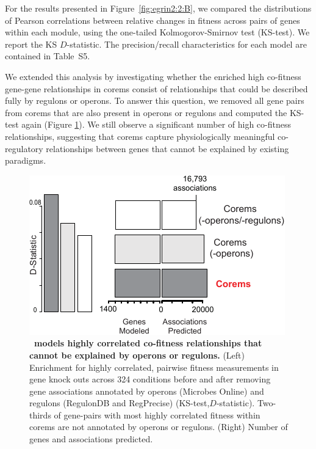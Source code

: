 For the results presented in Figure~\ref{fig:egrin2:2:B}, we compared the distributions of Pearson correlations between relative changes in fitness across pairs of genes within each module, using the one-tailed Kolmogorov-Smirnov test (KS-test). We report the KS $D$-statistic. The precision/recall characteristics for each model are contained in Table~S5.

We extended this analysis by investigating whether the enriched high co-fitness gene-gene relationships in corems consist of relationships that could be described fully by regulons or operons. To answer this question, we removed all gene pairs from corems that are also present in operons or regulons and computed the KS-test again (Figure \ref{fig:fitness_wo_operons}). We still observe a significant number of high co-fitness relationships, suggesting that corems capture physiologically meaningful co-regulatory relationships between genes that cannot be explained by existing paradigms.

\begin{figure}[hp]
\centering
\includegraphics[width=0.6\linewidth]{figures/fitness_wo_operons.pdf}
\caption[\egrine~models highly correlated co-fitness relationships that cannot be explained by operons or regulons]{\textbf{\egrine~models highly correlated co-fitness relationships that cannot be explained by operons or regulons.} (Left) Enrichment for highly correlated, pairwise fitness measurements in gene knock outs across 324 conditions before and after removing gene associations annotated by operons (Microbes Online) and regulons (RegulonDB and RegPrecise) (KS-test,$D$-statistic). Two-thirds of gene-pairs with most highly correlated fitness within corems are not annotated by operons or regulons. (Right) Number of genes and associations predicted.} 
\label{fig:fitness_wo_operons}
\end{figure}



 

 
 